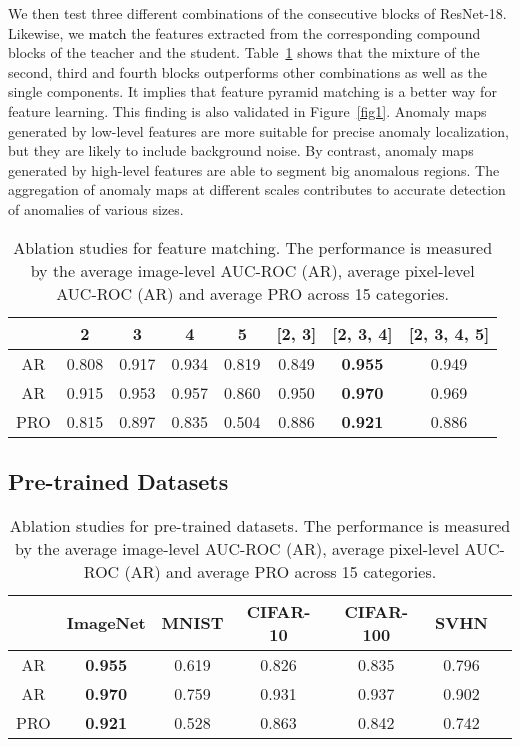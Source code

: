 \documentclass{bmvc2k}
\newcommand{\wgd}[1]{\textcolor{black}{{}#1}}
\begin{document}
We then test three different combinations of the consecutive blocks of ResNet-18. Likewise, we \wgd{match} the features extracted from the corresponding compound blocks of the teacher and the student. Table~\ref{tab6} shows that the mixture of the second, third and fourth blocks outperforms other combinations as well as the single components. It implies that feature pyramid matching is a better way for feature learning. This finding is also validated in Figure~\ref{fig1}. Anomaly maps generated by low-level features are more suitable for precise anomaly localization, but they are likely to include background noise. By contrast, anomaly maps generated by high-level features are able to segment big anomalous regions. The aggregation of anomaly maps at different scales contributes to accurate detection of anomalies of various sizes.



\begin{table}[!]
	\centering
	\begin{adjustbox}{width=0.9\textwidth}
		\begin{tabular}{c|ccccccc}
			\hline
			\diagbox{Metric}{\# Block} & 2 & 3 & 4 & 5 & [2, 3] & [2, 3, 4] & [2, 3, 4, 5]\\
			\hline
			AR & 0.808 & 0.917 & 0.934 & 0.819 & 0.849 & \textbf{0.955} & 0.949\\
			AR & 0.915 & 0.953 & 0.957 & 0.860 & 0.950 & \textbf{0.970} &  0.969\\
			PRO & 0.815 & 0.897 & 0.835 & 0.504 & 0.886 & \textbf{0.921} & 0.886\\
			\hline
		\end{tabular}
	\end{adjustbox}
	\caption{Ablation studies for feature matching. The performance is measured by the average image-level AUC-ROC (AR), average pixel-level AUC-ROC (AR) and average PRO across 15 categories.}
	\label{tab6}
\end{table}


\subsection{Pre-trained Datasets}
\label{sec5-sub3}

\begin{table}[!]
	\centering
	\begin{adjustbox}{width=0.8\textwidth}
		\begin{tabular}{c|cccccc}
			\hline
			\diagbox{Metric}{Dataset} & ImageNet & MNIST & CIFAR-10 & CIFAR-100 & SVHN\\
			\hline
			AR & \textbf{0.955} & 0.619 & 0.826 & 0.835 & 0.796\\
			AR & \textbf{0.970} & 0.759 & 0.931 & 0.937 & 0.902\\
			PRO & \textbf{0.921} & 0.528  & 0.863 & 0.842 & 0.742\\
			\hline
		\end{tabular}
	\end{adjustbox}
	\caption{Ablation studies for pre-trained datasets. The performance is measured by the average image-level AUC-ROC (AR), average pixel-level AUC-ROC (AR) and average PRO across 15 categories.}
	\label{tab8}
\end{table}
\end{document}
